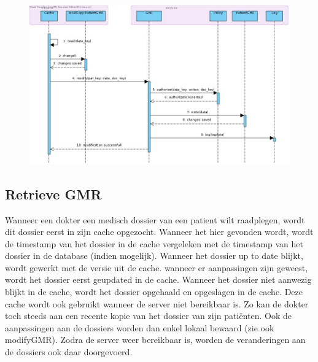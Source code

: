 \documentclass[a4paper,10pt]{article}
\begin{document}
\begin{center}
    \begin{figure}[!h]
      \includegraphics[width=\textwidth]{../images/modifyGMR.jpg}
    \end{figure}
  \end{center}

\subsection{Retrieve GMR}
Wanneer een dokter een medisch dossier van een patient wilt raadplegen, wordt dit dossier eerst in zijn cache opgezocht. Wanneer het hier gevonden wordt, wordt de timestamp van het dossier in de cache vergeleken met de timestamp van het dossier in de database (indien mogelijk). Wanneer het dossier up to date blijkt, wordt gewerkt met de versie uit de cache. wanneer er aanpassingen zijn geweest, wordt het dossier eerst geupdated in de cache. Wanneer het dossier niet aanwezig blijkt in de cache, wordt het dossier opgehaald en opgeslagen in de cache. 
Deze cache wordt ook gebruikt wanneer de server niet bereikbaar is. Zo kan de dokter toch steeds aan een recente kopie van het dossier van zijn patiënten. Ook de aanpassingen aan de dossiers worden dan enkel lokaal bewaard (zie ook modifyGMR). Zodra de server weer bereikbaar is, worden de veranderingen aan de dossiers ook daar doorgevoerd. 
\end{document}
